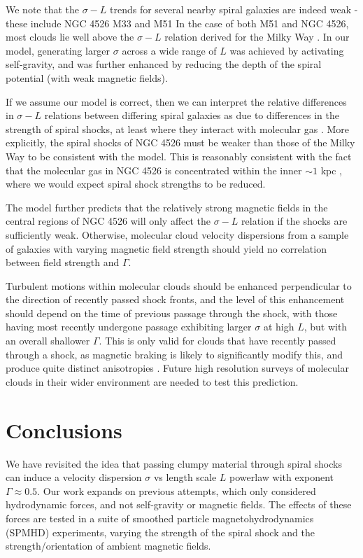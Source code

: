 \documentclass[a4paper,fleqn,usenatbib]{mnras}
\begin{document}
We note that the $\sigma-L$ trends for several nearby spiral galaxies are indeed weak - these include NGC 4526 \citep{Utomo2015} M33 \citep{Gratier2012} and M51 \citep{Colombo2014}  In the case of both M51 and NGC 4526, most clouds lie well above the $\sigma-L$ relation derived for the Milky Way \citep{Solomon1987}.  In our model, generating larger $\sigma$ across a wide range of $L$ was achieved by activating self-gravity, and was further enhanced by reducing the depth of the spiral potential (with weak magnetic fields).  

If we assume our model is correct, then we can interpret the relative differences in $\sigma-L$ relations between differing spiral galaxies as due to differences in the strength of spiral shocks, at least where they interact with molecular gas \citep[cf][]{Nguyen2018}.  More explicitly, the spiral shocks of NGC 4526 must be weaker than those of the Milky Way to be consistent with the model.  This is reasonably consistent with the fact that the molecular gas in NGC 4526 is concentrated within the inner $\sim 1$ kpc \citep{Davis2013}, where we would expect spiral shock strengths to be reduced.

The model further predicts that the relatively strong magnetic fields in the central regions of NGC 4526 will only affect the $\sigma-L$ relation if the shocks are sufficiently weak.  Otherwise, molecular cloud velocity dispersions from a sample of galaxies with varying magnetic field strength should yield no correlation between field strength and $\Gamma$.

Turbulent motions within molecular clouds should be enhanced perpendicular to the direction of recently passed shock fronts, and the level of this enhancement should depend on the time of previous passage through the shock, with those having most recently undergone passage exhibiting larger $\sigma$ at high $L$, but with an overall shallower $\Gamma$.  This is only valid for clouds that have recently passed through a shock, as magnetic braking is likely to significantly modify this, and produce quite distinct anisotropies \citep{Ossenkopf2002,Rosolowsky2003}.  Future high resolution surveys of molecular clouds in their wider environment are needed to test this prediction.

\section{Conclusions}
\label{sec:conclusions}

\noindent We have revisited the idea that passing clumpy material through spiral shocks can induce a velocity dispersion $\sigma$ vs length scale $L$ powerlaw with exponent $\Gamma \approx  0.5$.  Our work expands on previous attempts, which only considered hydrodynamic forces, and not self-gravity or magnetic fields.  The effects of these forces are tested in a suite of smoothed particle magnetohydrodynamics (SPMHD) experiments, varying the strength of the spiral shock and the strength/orientation of ambient magnetic fields.  
\end{document}
